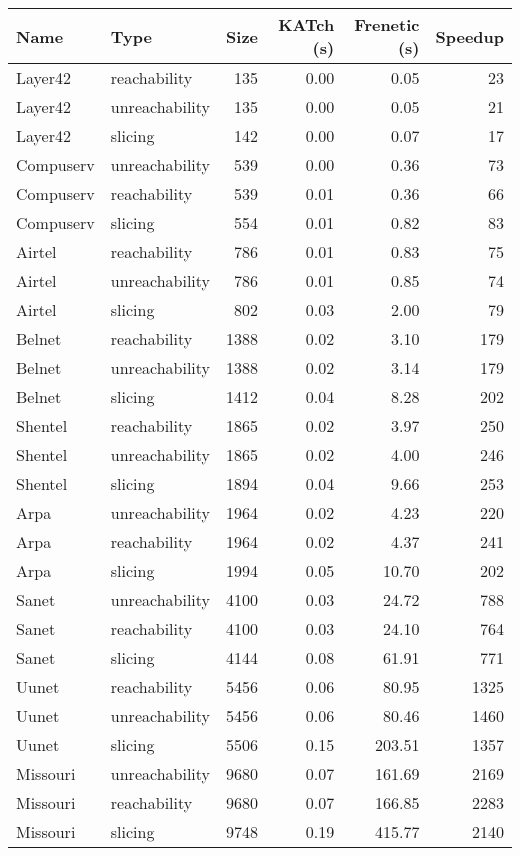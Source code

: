 \begin{tabular}{llrrrr}
\toprule
Name & Type & Size & KATch (s) & Frenetic (s) & Speedup \\
\midrule
Layer42 & reachability & 135 & 0.00 & 0.05 & 23 \\
Layer42 & unreachability & 135 & 0.00 & 0.05 & 21 \\
Layer42 & slicing & 142 & 0.00 & 0.07 & 17 \\
Compuserv & unreachability & 539 & 0.00 & 0.36 & 73 \\
Compuserv & reachability & 539 & 0.01 & 0.36 & 66 \\
Compuserv & slicing & 554 & 0.01 & 0.82 & 83 \\
Airtel & reachability & 786 & 0.01 & 0.83 & 75 \\
Airtel & unreachability & 786 & 0.01 & 0.85 & 74 \\
Airtel & slicing & 802 & 0.03 & 2.00 & 79 \\
Belnet & reachability & 1388 & 0.02 & 3.10 & 179 \\
Belnet & unreachability & 1388 & 0.02 & 3.14 & 179 \\
Belnet & slicing & 1412 & 0.04 & 8.28 & 202 \\
Shentel & reachability & 1865 & 0.02 & 3.97 & 250 \\
Shentel & unreachability & 1865 & 0.02 & 4.00 & 246 \\
Shentel & slicing & 1894 & 0.04 & 9.66 & 253 \\
Arpa & unreachability & 1964 & 0.02 & 4.23 & 220 \\
Arpa & reachability & 1964 & 0.02 & 4.37 & 241 \\
Arpa & slicing & 1994 & 0.05 & 10.70 & 202 \\
Sanet & unreachability & 4100 & 0.03 & 24.72 & 788 \\
Sanet & reachability & 4100 & 0.03 & 24.10 & 764 \\
Sanet & slicing & 4144 & 0.08 & 61.91 & 771 \\
Uunet & reachability & 5456 & 0.06 & 80.95 & 1325 \\
Uunet & unreachability & 5456 & 0.06 & 80.46 & 1460 \\
Uunet & slicing & 5506 & 0.15 & 203.51 & 1357 \\
Missouri & unreachability & 9680 & 0.07 & 161.69 & 2169 \\
Missouri & reachability & 9680 & 0.07 & 166.85 & 2283 \\
Missouri & slicing & 9748 & 0.19 & 415.77 & 2140 \\

\end{tabular}
